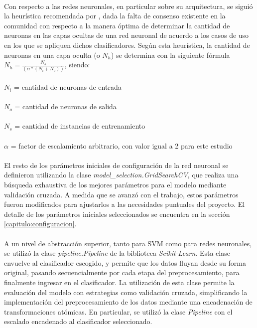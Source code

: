 \paragraph{} Con respecto a las redes neuronales, en particular sobre su arquitectura, se siguió la heurística recomendada por \citet{bib-heuristic-hobs}, dada la falta de consenso existente en la comunidad con respecto a la manera óptima de determinar la cantidad de neuronas en las capas ocultas de una red neuronal de acuerdo a los casos de uso en los que se apliquen dichos clasificadores.
Según esta heurística, la cantidad de neuronas en una capa oculta (o $N_h$) se determina con la siguiente fórmula $N_h = \frac{N_s} {(\alpha * (N_i + N_o))}$, siendo:
\\
\\
$N_i$ = cantidad de neuronas de entrada
\\
\\
$N_o$ = cantidad de neuronas de salida
\\
\\
$N_s$ = cantidad de instancias de entrenamiento
\\
\\
$\alpha$ = factor de escalamiento arbitrario, con valor igual a 2 para este estudio

\paragraph{} El resto de los parámetros iniciales de configuración de la red neuronal se definieron utilizando la clase \textit{model\_selection.GridSearchCV}, que realiza una búsqueda exhaustiva de los mejores parámetros para el modelo mediante validación cruzada.
A medida que se avanzó con el trabajo, estos parámetros fueron modificados para ajustarlos a las necesidades puntuales del proyecto.
El detalle de los parámetros iniciales seleccionados se encuentra en la sección \ref{capitulo:configuracion}.

\paragraph{} A un nivel de abstracción superior, tanto para SVM como para redes neuronales, se utilizó la clase \textit{pipeline.Pipeline} de la biblioteca \textit{Scikit-Learn}.
Esta clase envuelve al clasificador escogido, y permite que los datos fluyan desde su forma original, pasando secuencialmente por cada etapa del preprocesamiento, para finalmente ingresar en el clasificador.
La utilización de esta clase permite la evaluación del modelo con estrategias como validación cruzada, simplificando la implementación del preprocesamiento de los datos mediante una encadenación de transformaciones atómicas.
En particular, se utilizó la clase \textit{Pipeline} con el escalado encadenado al clasificador seleccionado. 


